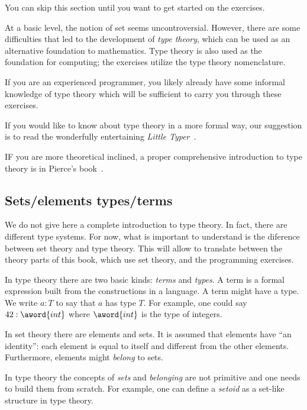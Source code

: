 
\begin{remark}
	You can skip this section until you want to get started on the exercises.
\end{remark}

At a basic level, the notion of set seems uncontroversial.
However, there are some difficulties that led to the development of \emph{type theory},
which can be used as an alternative foundation to mathematics.
Type theory is also used as the foundation for computing; the exercises utilize the type theory nomenclature.

If you are an experienced programmer, you likely already have some informal knowledge of type theory which will be sufficient to carry you through these exercises.

If you would like to know about type theory in a more formal way, our suggestion is to read the wonderfully entertaining \emph{Little Typer}~\cite{friedman2018little}.

IF you are more theoretical inclined, a proper comprehensive introduction to type theory is in Pierce's book~\cite{pierce02types}.

\subsection{Sets/elements \vs types/terms}
We do not give here a complete introduction to type theory.
In fact, there are different type systems.
For now, what is important to understand is the diference between set theory and type theory.
This will allow to translate between the theory parts of this book, which use set theory, and the programming exercises.

In type theory there are two basic kinds: \emph{terms} and \emph{types}.
A term is a formal expression built from the constructions in a language.
A term might have a type.
We write $a : T$ to say that $a$ has type $T$.
For example, one could say $42 : \aword{int}$ where $\aword{int}$ is the type of integers.

In set theory there are elements and sets.
It is assumed that elements have ``an identity'': each element is equal to itself and different from the other elements.
Furthermore, elements might \emph{belong} to sets.

In type theory the concepts of \emph{sets} and \emph{belonging} are not primitive and one needs to build them from scratch.
For example, one can define a \emph{setoid} as a set-like structure in type theory.

